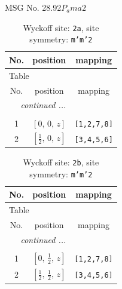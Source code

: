 \documentclass[fleqn,8pt]{jsarticle}
\begin{document}
\setcounter{MaxMatrixCols}{32}

\renewcommand{\tablename}{Table~}
\renewcommand{\figurename}{Figure~}
\begin{center}
\LARGE
MSG No. 28.92\quad$P_{a}ma2$
\end{center}
\renewcommand{\arraystretch}{1.2}
\begin{longtable}{ccc}
\caption{Wyckoff site: {\tt 2a}, site symmetry: {\tt m'm'2}}
 \\
 \hline \hline
No. & position & mapping \\ \hline \endfirsthead

\multicolumn{2}{l}{\tablename\ \thetable{}} \\
 \hline \hline
No. & position & mapping \\ \hline \endhead

 \hline \hline
\multicolumn{2}{r}{\footnotesize\it continued ...} \\ \endfoot

 \hline \hline
\multicolumn{2}{r}{} \\ \endlastfoot

1 & $\left[ 0,\, 0,\, z \right]$ & {\tt [1,2,7,8]} \\ \hline
2 & $\left[ \frac{1}{2},\, 0,\, z \right]$ & {\tt [3,4,5,6]} \\
\end{longtable}
\renewcommand{\arraystretch}{1.2}
\begin{longtable}{ccc}
\caption{Wyckoff site: {\tt 2b}, site symmetry: {\tt m'm'2}}
 \\
 \hline \hline
No. & position & mapping \\ \hline \endfirsthead

\multicolumn{2}{l}{\tablename\ \thetable{}} \\
 \hline \hline
No. & position & mapping \\ \hline \endhead

 \hline \hline
\multicolumn{2}{r}{\footnotesize\it continued ...} \\ \endfoot

 \hline \hline
\multicolumn{2}{r}{} \\ \endlastfoot

1 & $\left[ 0,\, \frac{1}{2},\, z \right]$ & {\tt [1,2,7,8]} \\ \hline
2 & $\left[ \frac{1}{2},\, \frac{1}{2},\, z \right]$ & {\tt [3,4,5,6]} \\
\end{longtable}
\renewcommand{\arraystretch}{1.2}
\end{document}
